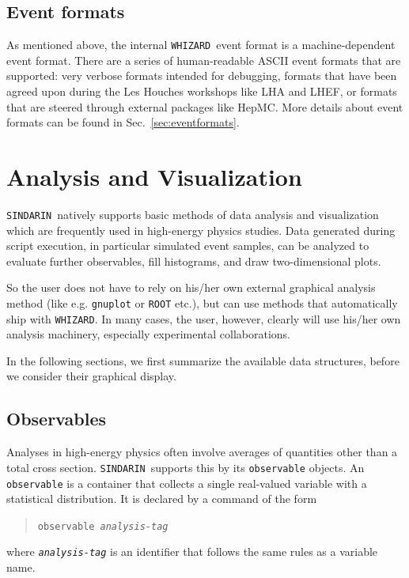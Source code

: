 \documentclass[12pt]{book}
\newcommand{\ttt}[1]{\texttt{#1}}
\newcommand{\whizard}{\ttt{WHIZARD}}
\newcommand{\sindarin}{\ttt{SINDARIN}}
\begin{document}

\subsection{Event formats}

As mentioned above, the internal \whizard\ event format is a
machine-dependent event format. There are a series of human-readable
ASCII event formats that are supported: very verbose formats intended
for debugging, formats that have been agreed upon during the Les
Houches workshops like LHA and LHEF, or formats that are steered
through external packages like HepMC. More details about event formats
can be found in Sec.~\ref{sec:eventformats}.


\section{Analysis and Visualization}
\label{sec:analysis}

\sindarin\ natively supports basic methods of data analysis and visualization
which are frequently used in high-energy physics studies.  Data generated
during script execution, in particular simulated event samples, can be
analyzed to evaluate further observables, fill histograms, and draw
two-dimensional plots.

So the user does not have to rely on his/her own external graphical
analysis method (like e.g. \ttt{gnuplot} or \ttt{ROOT} etc.), but can
use methods that automatically ship with \whizard. In many cases, the
user, however, clearly will use his/her own analysis machinery,
especially experimental collaborations.

In the following sections, we first summarize the available data structures,
before we consider their graphical display.



\subsection{Observables}

Analyses in high-energy physics often involve averages of quantities other
than a total cross section.  \sindarin\ supports this by its \ttt{observable}
objects.  An \ttt{observable} is a container that collects a single
real-valued variable with a statistical distribution.  It is declared by a
command of the form
\begin{quote}
  \begin{footnotesize}
\ttt{observable \emph{analysis-tag}}
  \end{footnotesize}
\end{quote}
where \ttt{\emph{analysis-tag}} is an identifier that follows the same rules
as a variable name.
\end{document}
